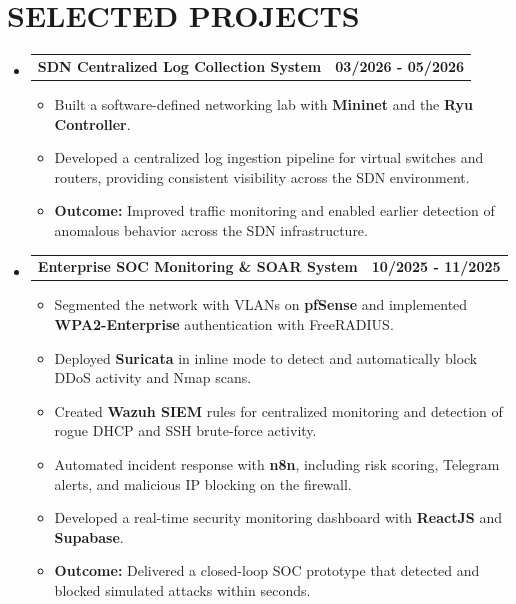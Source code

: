 \documentclass[10pt,a4paper]{article}
\makeatletter
\newcommand{\resumeProjectHeading}[2]{
    \vspace{-1pt}\item
    \begin{tabularx}{\linewidth}[t]{@{}Xr@{}}
      \textbf{#1} & \textbf{#2} \\
    \end{tabularx}\vspace{-1pt}
}
\makeatother
\begin{document}
\section*{SELECTED PROJECTS}
\begin{itemize}[leftmargin=0.15in, label={}]
  \resumeProjectHeading
    {SDN Centralized Log Collection System}{03/2026 - 05/2026}
    \begin{itemize}[leftmargin=0.15in, label=\textbullet]
        \item Built a software-defined networking lab with \textbf{Mininet} and the \textbf{Ryu Controller}.
        \item Developed a centralized log ingestion pipeline for virtual switches and routers, providing consistent visibility across the SDN environment.
        \item \textbf{Outcome:} Improved traffic monitoring and enabled earlier detection of anomalous behavior across the SDN infrastructure.
    \end{itemize}
  \vspace{2pt}
  \resumeProjectHeading
    {Enterprise SOC Monitoring \& SOAR System}{10/2025 - 11/2025}
    \begin{itemize}[leftmargin=0.15in, label=\textbullet]
        \item Segmented the network with VLANs on \textbf{pfSense} and implemented \textbf{WPA2-Enterprise} authentication with FreeRADIUS.
        \item Deployed \textbf{Suricata} in inline mode to detect and automatically block DDoS activity and Nmap scans.
        \item Created \textbf{Wazuh SIEM} rules for centralized monitoring and detection of rogue DHCP and SSH brute-force activity.
        \item Automated incident response with \textbf{n8n}, including risk scoring, Telegram alerts, and malicious IP blocking on the firewall.
        \item Developed a real-time security monitoring dashboard with \textbf{ReactJS} and \textbf{Supabase}.
        \item \textbf{Outcome:} Delivered a closed-loop SOC prototype that detected and blocked simulated attacks within seconds.
    \end{itemize}
\end{itemize}

\end{document}
